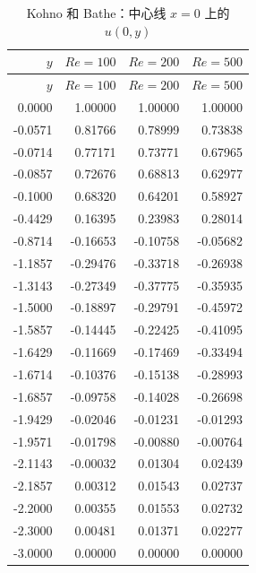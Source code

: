 \documentclass[UTF8,a4paper,11pt]{ctexart}
\begin{document}
\begin{longtable}{r|rrr}
\caption{Kohno 和 Bathe\cite{Kohno2006}：中心线 \(x=0\) 上的 \(u(0,y)\)}
\label{tab:tri-u}\\
\toprule
\(y\) & \(Re=100\) & \(Re=200\) & \(Re=500\) \\
\midrule
\endfirsthead
\toprule
\(y\) & \(Re=100\) & \(Re=200\) & \(Re=500\) \\
\midrule
\endhead
0.0000  & 1.00000  & 1.00000  & 1.00000 \\
-0.0571 & 0.81766  & 0.78999  & 0.73838 \\
-0.0714 & 0.77171  & 0.73771  & 0.67965 \\
-0.0857 & 0.72676  & 0.68813  & 0.62977 \\
-0.1000 & 0.68320  & 0.64201  & 0.58927 \\
-0.4429 & 0.16395  & 0.23983  & 0.28014 \\
-0.8714 & -0.16653 & -0.10758 & -0.05682 \\
-1.1857 & -0.29476 & -0.33718 & -0.26938 \\
-1.3143 & -0.27349 & -0.37775 & -0.35935 \\
-1.5000 & -0.18897 & -0.29791 & -0.45972 \\
-1.5857 & -0.14445 & -0.22425 & -0.41095 \\
-1.6429 & -0.11669 & -0.17469 & -0.33494 \\
-1.6714 & -0.10376 & -0.15138 & -0.28993 \\
-1.6857 & -0.09758 & -0.14028 & -0.26698 \\
-1.9429 & -0.02046 & -0.01231 & -0.01293 \\
-1.9571 & -0.01798 & -0.00880 & -0.00764 \\
-2.1143 & -0.00032 & 0.01304 & 0.02439 \\
-2.1857 & 0.00312 & 0.01543 & 0.02737 \\
-2.2000 & 0.00355 & 0.01553 & 0.02732 \\
-2.3000 & 0.00481 & 0.01371 & 0.02277 \\
-3.0000 & 0.00000 & 0.00000 & 0.00000 \\
\bottomrule
\end{longtable}
\end{document}

